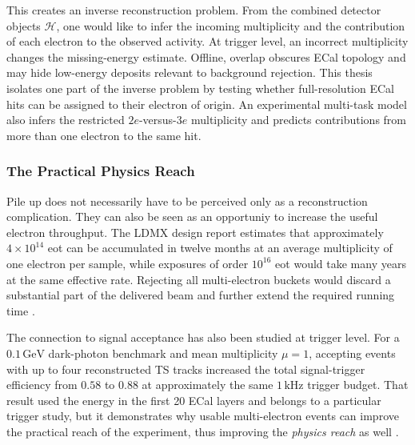 This creates an inverse reconstruction problem. From the combined detector
objects \(\mathcal{H}\), one would like to infer the incoming multiplicity and
the contribution of each electron to the observed activity. At trigger level,
an incorrect multiplicity changes the missing-energy estimate. Offline,
overlap obscures ECal topology and may hide low-energy deposits relevant to
background rejection. This thesis isolates one part of the inverse problem by
testing whether full-resolution ECal hits can be assigned to their electron
of origin. An experimental multi-task model also infers the restricted
\(2e\)-versus-\(3e\) multiplicity and predicts contributions from more than
one electron to the same hit.




\subsubsection{The Practical Physics Reach}
\label{sec:practical_physics_reach}

Pile up does not necessarily have to be perceived only as a reconstruction complication. They can
also be seen as an opportuniy to increase the useful electron throughput. The LDMX design report
estimates that approximately \(4\times10^{14}\) \gls{eot} can be accumulated
in twelve months at an average multiplicity of one electron per sample, while
exposures of order \(10^{16}\) \gls{eot} would take many years at the same
effective rate. Rejecting all multi-electron buckets would discard a
substantial part of the delivered beam and further extend the required
running time \cite{ldmx2025-overview}.

The connection to signal acceptance has also been studied at trigger level.
For a \(0.1\,\mathrm{GeV}\) dark-photon benchmark and mean multiplicity
\(\mu=1\), accepting events with up to four reconstructed TS tracks increased
the total signal-trigger efficiency from \(0.58\) to \(0.88\) at
approximately the same \(1\,\mathrm{kHz}\) trigger budget. That result used
the energy in the first 20 ECal layers and belongs to a particular trigger
study, but it demonstrates why usable multi-electron events can improve the
practical reach of the experiment, thus improving the \textit{physics reach} as well \cite{ldmx2025-overview}.

